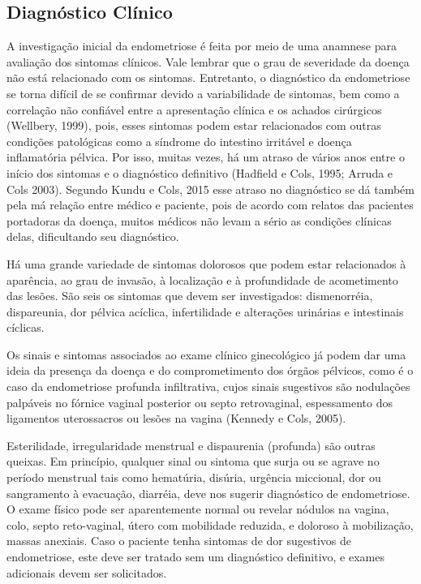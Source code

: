 \documentclass[12pt]{article} %
\begin{document}
\newpage

\subsection{Diagnóstico Clínico}

A investigação inicial da endometriose é feita por meio de uma
anamnese para avaliação dos sintomas clínicos. Vale lembrar que o grau
de severidade da doença não está relacionado com os sintomas.
Entretanto, o diagnóstico da endometriose se torna difícil de se
confirmar devido a variabilidade de sintomas, bem como a correlação
não confiável entre a apresentação clínica e os achados cirúrgicos
(Wellbery, 1999), pois, esses sintomas podem estar relacionados com
outras condições patológicas como a síndrome do intestino irritável e
doença inflamatória pélvica. Por isso, muitas vezes, há um atraso de
vários anos entre o início dos sintomas e o diagnóstico definitivo
(Hadfield e Cols, 1995; Arruda e Cols 2003). Segundo Kundu e Cols,
2015 esse atraso no diagnóstico se dá também pela má relação entre
médico e paciente, pois de acordo com relatos das pacientes portadoras
da doença, muitos médicos não levam a sério as condições clínicas
delas, dificultando seu diagnóstico.

Há uma grande variedade de sintomas dolorosos que podem estar
relacionados à aparência, ao grau de invasão, à localização e à
profundidade de acometimento das lesões. São seis os sintomas que
devem ser investigados: dismenorréia, dispareunia, dor pélvica
acíclica, infertilidade e alterações urinárias e intestinais cíclicas.

Os sinais e sintomas associados ao exame clínico ginecológico já podem
dar uma ideia da presença da doença e do comprometimento dos órgãos
pélvicos, como é o caso da endometriose profunda infiltrativa, cujos
sinais sugestivos são nodulações palpáveis no fórnice vaginal
posterior ou septo retrovaginal, espessamento dos ligamentos
uterossacros ou lesões na vagina (Kennedy e Cols, 2005).

Esterilidade, irregularidade menstrual e dispaurenia (profunda) são
outras queixas. Em princípio, qualquer sinal ou sintoma que surja ou
se agrave no período menstrual tais como hematúria, disúria,
urgência miccional, dor ou sangramento à evacuação,
diarréia, deve nos sugerir diagnóstico de endometriose. O exame físico
pode ser aparentemente normal ou revelar nódulos na vagina, colo,
septo reto-vaginal, útero com
mobilidade reduzida, e doloroso à mobilização, massas anexiais. Caso o paciente tenha sintomas de dor sugestivos de endometriose,
este deve ser tratado sem um diagnóstico definitivo, e exames
adicionais devem ser solicitados.
 
\end{document}
